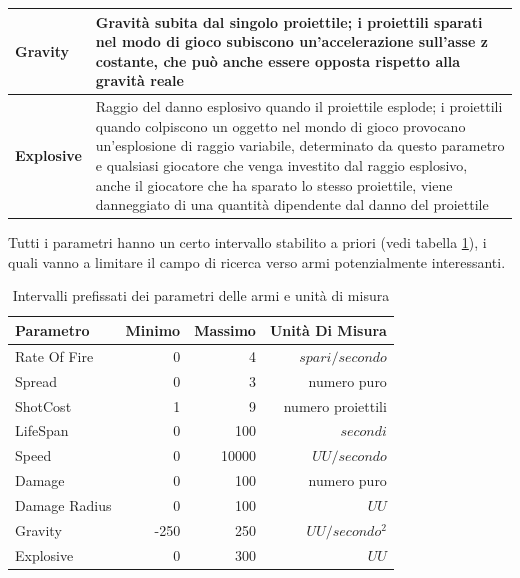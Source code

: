 \documentclass[12pt, italian]{toptesi}
\begin{document}
\begin{table}[htp]
\begin{tabularx}{\textwidth}{lX}
	\midrule
	\textbf{Gravity } &   Gravità subita dal singolo proiettile; i proiettili sparati nel modo di gioco subiscono un'accelerazione sull'asse z costante, che può anche essere opposta rispetto alla gravità reale\\
	\midrule
	\textbf{Explosive} &   Raggio del danno esplosivo quando il proiettile esplode; i proiettili quando colpiscono un oggetto nel mondo di gioco provocano un'esplosione di raggio variabile, determinato da questo parametro e qualsiasi giocatore                				       che venga investito dal raggio esplosivo, anche il giocatore che ha sparato lo stesso proiettile, viene danneggiato di una quantità dipendente dal danno del proiettile\\
	\bottomrule
	\end{tabularx}
\end{table}
Tutti i parametri hanno un certo intervallo stabilito a priori (vedi tabella \ref{tab:limiti}), i quali vanno a limitare il campo di ricerca verso armi potenzialmente interessanti.

\begin{table}[htp]
\caption{Intervalli prefissati dei parametri delle armi e unità di misura}
\label{tab:limiti}
\centering
	\begin{tabular}{lrrr}
	\toprule
	Parametro & Minimo & Massimo & Unità Di Misura\\
	\midrule
	Rate Of Fire & 0 & 4 & $spari/secondo$\\
	Spread & 0 & 3 & numero puro \\
	ShotCost & 1 & 9 & numero proiettili\\
	LifeSpan & 0 & 100 & $secondi$\\
	Speed & 0 & 10000 & $UU/secondo$\\
	Damage & 0 & 100 & numero puro\\
	Damage Radius & 0 & 100  & $UU$\\
	Gravity & -250 & 250 & $UU/secondo^2$\\ 
	Explosive & 0 & 300  & $ UU $\\
	\bottomrule
	\end{tabular}
\end{table}
\end{document}
